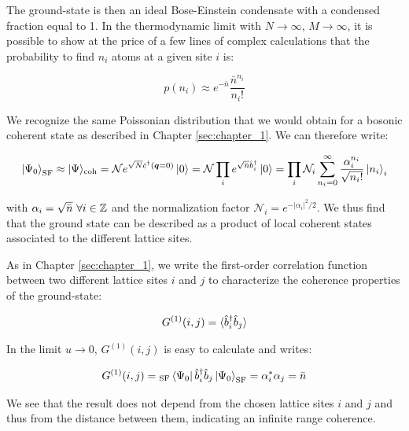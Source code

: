 \noindent The ground-state is then an ideal Bose-Einstein condensate with a condensed fraction equal to 1. In the thermodynamic limit with $N \to \infty$, $M \to \infty$, it is possible to show at the price of a few lines of complex calculations \cite{gerbier_notes} that the probability to find $n_i$ atoms at a given site $i$ is:

\begin{equation}
    p\left(n_{i}\right) \approx e^{-\bar{n}} \frac{\bar{n}^{n_{i}}}{n_{i} !}
\end{equation}

\noindent We recognize the same Poissonian distribution that we would obtain for a bosonic coherent state as described in Chapter \ref{sec:chapter_1}. We can therefore write:

\begin{equation}
    \ket{\Psi_0}_{\mathrm{SF}} \approx |\Psi\rangle_{\mathrm{coh}}=\mathcal{N} e^{\sqrt{N} \hat{c}^{\dagger}(\bm{q}=0)} \ket{0} = \mathcal{N} \prod_{i} e^{\sqrt{\bar{n}} \hat{b}_{i}^{\dagger}} \ket{0} = \prod_{i} \mathcal{N}_{i} \sum_{n_{i}=0}^{\infty} \frac{\alpha_{i}^{n_{i}}}{\sqrt{n_{i} !}}\left|n_{i}\right\rangle_{i}
    \label{eq:ground-state_superfluid}
\end{equation}

\noindent with $\alpha_i=\sqrt{\bar{n}} \ \forall i \in \mathbb{Z}$ and the normalization factor $\mathcal{N}_{i}=e^{-\left|\alpha_{i}\right|^{2} / 2}$. We thus find that the ground state can be described as a product of local coherent states associated to the different lattice sites.

As in Chapter \ref{sec:chapter_1}, we write the first-order correlation function between two different lattice sites $i$ and $j$ to characterize the coherence properties of the ground-state:

\begin{equation}
    G^{(1)}(i,j)= \langle\hat{b}^{\dagger}_i \hat{b}_j\rangle
\end{equation}

\noindent In the limit $u \to 0$, $G^{(1)}(i,j)$ is easy to calculate and writes:

\begin{equation}
    G^{(1)}(i,j)= {}_{\mathrm{SF}} \bra{\Psi_0} \hat{b}^{\dagger}_i \hat{b}_j \ket{\Psi_0}_{\mathrm{SF}} = \alpha^*_i \alpha_j = \bar{n}
\end{equation}

\noindent We see that the result does not depend from the chosen lattice sites $i$ and $j$ and thus from the distance between them, indicating an infinite range coherence.


